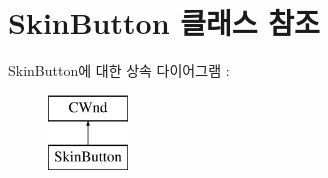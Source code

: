 \hypertarget{class_skin_button}{}\section{Skin\+Button 클래스 참조}
\label{class_skin_button}
Skin\+Button에 대한 상속 다이어그램 \+: \begin{figure}[H]
\begin{center}
\leavevmode
\includegraphics[height=2.000000cm]{class_skin_button}
\end{center}
\end{figure}

